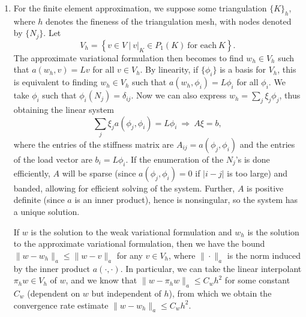 \documentclass{article}
\begin{document}
\begin{enumerate}
\begin{enumerate}
\item For the finite element approximation, we suppose some triangulation \(\{K\}_h\), where \(h\) denotes the fineness of the triangulation mesh, with nodes denoted by \(\{N_j\}\).  Let
\[V_h = \left\{ v \in V \ | \ v|_K \in P_1(K) \ \text{for each} \ K \right\}.\]
The approximate variational formulation then becomes to find \(w_h \in V_h\) such that \(a(w_h,v) = Lv\) for all \(v \in V_h\).  By linearity, if \(\{\phi_i\}\) is a basis for \(V_h\), this is equivalent to finding \(w_h \in V_h\) such that \(a(w_h,\phi_i) = L\phi_i\) for all \(\phi_i\).  We take \(\phi_i\) such that \(\phi_i(N_j) = \delta_{ij}\).  Now we can also express \(w_h = \sum_j \xi_j \phi_j\), thus obtaining the linear system
\[\sum_j \xi_j a(\phi_j,\phi_i) = L\phi_i \ \Rightarrow \ A \xi = b,\]
where the entries of the stiffness matrix are \(A_{ij} = a(\phi_j,\phi_i)\) and the entries of the load vector are \(b_i = L\phi_i\).  If the enumeration of the \(N_j\)'s is done efficiently, \(A\) will be sparse (since \(a(\phi_j,\phi_i) = 0\) if \(|i - j|\) is too large) and banded, allowing for efficient solving of the system.  Further, \(A\) is positive definite (since \(a\) is an inner product), hence is nonsingular, so the system has a unique solution.

If \(w\) is the solution to the weak variational formulation and \(w_h\) is the solution to the approximate variational formulation, then we have the bound \(\|w - w_h\|_a \leq \|w - v\|_a\) for any \(v \in V_h\), where \(\|\cdot\|_a\) is the norm induced by the inner product \(a(\cdot,\cdot)\).  In particular, we can take the linear interpolant \(\pi_h w \in V_h\) of \(w\), and we know that \(\|w - \pi_h w\|_a \leq C_w h^2\) for some constant \(C_w\) (dependent on \(w\) but independent of \(h\)), from which we obtain the convergence rate estimate \(\|w - w_h\|_a \leq C_w h^2\).

\end{enumerate}



\end{enumerate}
\end{document}
